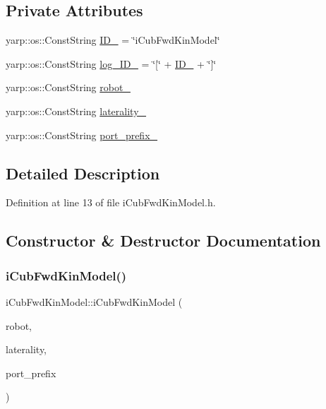 \subsection*{Private Attributes}
\begin{DoxyCompactItemize}
\item 
yarp\+::os\+::\+Const\+String \hyperlink{classiCubFwdKinModel_a3eb6c400ef775a5549aa31fe22fae4c0}{I\+D\+\_\+} = \char`\"{}i\+Cub\+Fwd\+Kin\+Model\char`\"{}
\item 
yarp\+::os\+::\+Const\+String \hyperlink{classiCubFwdKinModel_a091abb2a5386537d63a67fbf761a2e8a}{log\+\_\+\+I\+D\+\_\+} = \char`\"{}\mbox{[}\char`\"{} + \hyperlink{classiCubFwdKinModel_a3eb6c400ef775a5549aa31fe22fae4c0}{I\+D\+\_\+} + \char`\"{}\mbox{]}\char`\"{}
\item 
yarp\+::os\+::\+Const\+String \hyperlink{classiCubFwdKinModel_ad0fec4635ff934435b24d717cb553014}{robot\+\_\+}
\item 
yarp\+::os\+::\+Const\+String \hyperlink{classiCubFwdKinModel_a9894964cecb15d56a55ea1f4610a1cbe}{laterality\+\_\+}
\item 
yarp\+::os\+::\+Const\+String \hyperlink{classiCubFwdKinModel_a294f61787264b6a3e9dc1eb9dbc72ed0}{port\+\_\+prefix\+\_\+}
\end{DoxyCompactItemize}


\subsection{Detailed Description}


Definition at line 13 of file i\+Cub\+Fwd\+Kin\+Model.\+h.



\subsection{Constructor \& Destructor Documentation}
\mbox{\label{classiCubFwdKinModel_a97bd690952f48bb7d7994ff3d2d8b2b9}} 
\subsubsection{\texorpdfstring{i\+Cub\+Fwd\+Kin\+Model()}{iCubFwdKinModel()}}
{\footnotesize\ttfamily i\+Cub\+Fwd\+Kin\+Model\+::i\+Cub\+Fwd\+Kin\+Model (\begin{DoxyParamCaption}\item[{const yarp\+::os\+::\+Const\+String \&}]{robot,  }\item[{const yarp\+::os\+::\+Const\+String \&}]{laterality,  }\item[{const yarp\+::os\+::\+Const\+String \&}]{port\+\_\+prefix }\end{DoxyParamCaption})}




